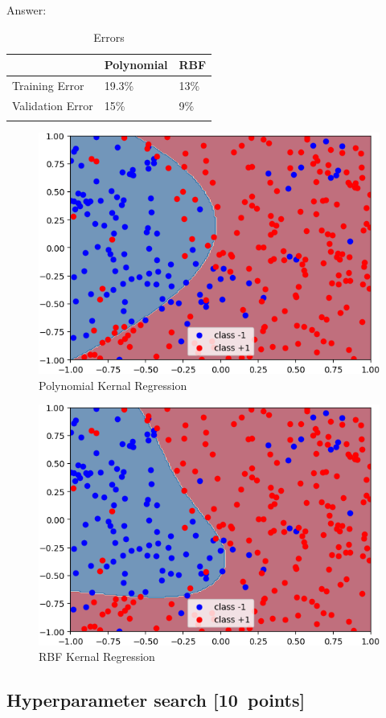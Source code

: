 \documentclass{article}
\newenvironment{answer}{\par\begingroup\color{gre}Answer: }{\endgroup}
\newcommand\pts[1]{\textcolor{pointscolour}{[#1~points]}}
\begin{document}
\begin{answer}
	\begin{table}
		\centering
		\begin{tabular}{lll}
			\hline 
			& Polynomial & RBF  \\
			\hline 
			Training Error & 19.3\% & 13\%   \\
			Validation Error & 15\% &  9\%  \\
			\hline \\
		\end{tabular}
		\caption{Errors}
	\end{table}

	\begin{figure}
		\centering
		\includegraphics[width = .5\textwidth]{figs/logRegPoly.png}
		\caption{Polynomial Kernal Regression}
	\end{figure}


	\begin{figure}
		\centering
		\includegraphics[width = .5\textwidth]{figs/logRegRBF.png}
		\caption{RBF Kernal Regression}
	\end{figure}


\end{answer}



\subsection{Hyperparameter search \pts{10}}
\end{document}
